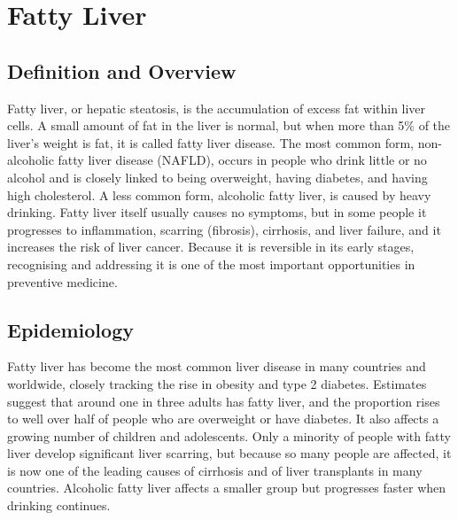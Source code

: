 \chapter{Fatty Liver}

\section*{Definition and Overview}
Fatty liver, or hepatic steatosis, is the accumulation of excess fat within liver cells. A small amount of fat in the liver is normal, but when more than 5\% of the liver's weight is fat, it is called fatty liver disease. The most common form, non-alcoholic fatty liver disease (NAFLD), occurs in people who drink little or no alcohol and is closely linked to being overweight, having diabetes, and having high cholesterol. A less common form, alcoholic fatty liver, is caused by heavy drinking. Fatty liver itself usually causes no symptoms, but in some people it progresses to inflammation, scarring (fibrosis), cirrhosis, and liver failure, and it increases the risk of liver cancer. Because it is reversible in its early stages, recognising and addressing it is one of the most important opportunities in preventive medicine.

\section*{Epidemiology}
Fatty liver has become the most common liver disease in many countries and worldwide, closely tracking the rise in obesity and type 2 diabetes. Estimates suggest that around one in three adults has fatty liver, and the proportion rises to well over half of people who are overweight or have diabetes. It also affects a growing number of children and adolescents. Only a minority of people with fatty liver develop significant liver scarring, but because so many people are affected, it is now one of the leading causes of cirrhosis and of liver transplants in many countries. Alcoholic fatty liver affects a smaller group but progresses faster when drinking continues.

